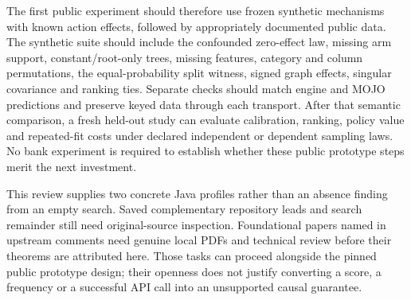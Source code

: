 The first public experiment should therefore use frozen synthetic mechanisms
with known action effects, followed by appropriately documented public data.
The synthetic suite should include the confounded zero-effect law, missing arm
support, constant/root-only trees, missing features, category and column
permutations, the equal-probability split witness, signed graph effects,
singular covariance and ranking ties. Separate checks should match engine and
MOJO predictions and preserve keyed data through each transport. After that
semantic comparison, a fresh held-out study can evaluate calibration, ranking,
policy value and repeated-fit costs under declared independent or dependent
sampling laws. No bank experiment is required to establish whether these
public prototype steps merit the next investment.
\citep{exec20_javaeffects_reference}

This review supplies two concrete Java profiles rather than an absence finding
from an empty search. Saved complementary repository leads and search remainder
still need original-source inspection. Foundational papers named in upstream
comments need genuine local PDFs and technical review before their theorems
are attributed here. Those tasks can proceed alongside the pinned public
prototype design; their openness does not justify converting a score, a
frequency or a successful API call into an unsupported causal guarantee.
\citep{exec20_javaeffects_h2o,exec20_javaeffects_tetrad}
